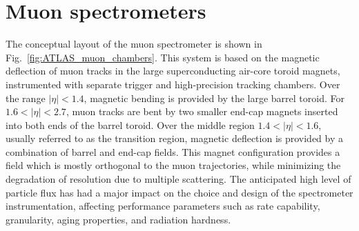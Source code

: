 \section{Muon spectrometers}
\label{sec:ATLAS_muon_chambers}

\begin{figure}
\end{figure}


The conceptual layout of the muon spectrometer is shown in Fig.~\ref{fig:ATLAS_muon_chambers}. This system is based on the magnetic
deflection of muon tracks in the large superconducting air-core toroid magnets, instrumented with
separate trigger and high-precision tracking chambers. Over the range $|\eta| < 1.4$, magnetic bending
is provided by the large barrel toroid. For $1.6 < |\eta| < 2.7$, muon tracks are bent by two smaller
end-cap magnets inserted into both ends of the barrel toroid. Over the middle region $1.4 < |\eta| < 1.6$, usually referred
to as the transition region, magnetic deflection is provided by a combination of barrel and end-cap
fields. This magnet configuration provides a field which is mostly orthogonal to the muon trajectories, while minimizing the degradation of resolution due to multiple scattering. The anticipated
high level of particle flux has had a major impact on the choice and design of the spectrometer instrumentation,
affecting performance parameters such as rate capability, granularity, aging
properties, and radiation hardness.

